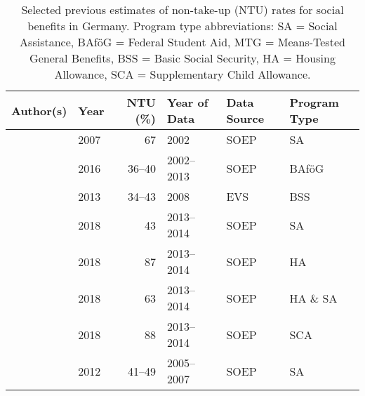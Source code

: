 \begin{table}[htbp]
\footnotesize
\centering
\begin{tabular}{llrlll}
\toprule
\textbf{Author(s)} & \textbf{Year} & \textbf{NTU (\%)} & \textbf{Year of Data} & \textbf{Data Source} & \textbf{Program Type} \\
\midrule
\citeauthor{frick_claim_2007}              & 2007          & 67             & 2002                  & SOEP             & SA               \\
\citeauthor{herber_non-take-up_2019}       & 2016          & 36--40         & 2002--2013            & SOEP             & BAföG            \\
\citeauthor{RePEc:iab:iabfob:201305}       & 2013          & 34--43         & 2008                  & EVS              & BSS              \\
\citeauthor{bruckmeier_benefit_2018}       & 2018          & 43             & 2013--2014            & SOEP             & SA               \\
\citeauthor{bruckmeier_benefit_2018}       & 2018          & 87             & 2013--2014            & SOEP             & HA               \\
\citeauthor{bruckmeier_benefit_2018}       & 2018          & 63             & 2013--2014            & SOEP             & HA \& SA         \\
\citeauthor{bruckmeier_benefit_2018}       & 2018          & 88             & 2013--2014            & SOEP             & SCA              \\
\citeauthor{bruckmeier_new_2012}           & 2012          & 41--49         & 2005--2007            & SOEP             & SA               \\
\bottomrule
\end{tabular}
\caption{\small{Selected previous estimates of non-take-up (NTU) rates for social benefits in Germany. Program type abbreviations: SA = Social Assistance, BAföG = Federal Student Aid, MTG = Means-Tested General Benefits, BSS = Basic Social Security, HA = Housing Allowance, SCA = Supplementary Child Allowance.}}
\label{table:NTU-studies}
\end{table}
